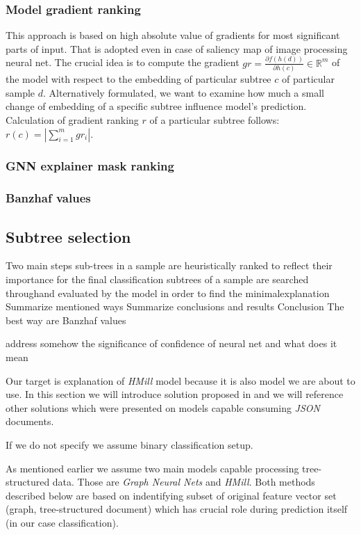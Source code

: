 \subsubsection{Model gradient ranking}
This approach is based on high absolute value of gradients for most significant parts of input. That is adopted even in case of saliency map of image processing neural net. The crucial idea is to compute the gradient $gr=\frac{\partial f(h(d))}{\partial h(c)} \in \mathbb{R}^m$ of the model with respect to the embedding of particular subtree $c$ of particular sample $d$. Alternatively formulated, we want to examine how much a small change of embedding of a specific subtree influence model's prediction. Calculation of gradient ranking $r$ of a particular subtree follows: $r(c)=|\sum_{i=1}^{m}gr_i|$.
\subsubsection{GNN explainer mask ranking}

\subsubsection{Banzhaf values}


\subsection{Subtree selection}

Two main steps
    sub-trees in a sample are heuristically ranked to reflect their importance for the final classification
    subtrees of a sample are searched throughand evaluated by the model in order to find the minimalexplanation
Summarize mentioned ways
Summarize conclusions and results
    Conclusion The best way are Banzhaf values

address somehow the significance of confidence of neural net and what does it mean


Our target is explanation of \emph{HMill} model because it is also model we are about to use. In this section we will introduce solution proposed in \cite{Pevny2020} and we will reference other solutions which were presented on models capable consuming \emph{JSON} documents.

If we do not specify we assume binary classification setup.

As mentioned earlier we assume two main models capable processing tree-structured data. Those are \emph{Graph Neural Nets} and \emph{HMill}. Both methods described below are based on indentifying subset of original feature vector set (graph, tree-structured document) which has crucial role during prediction itself (in our case classification). 

